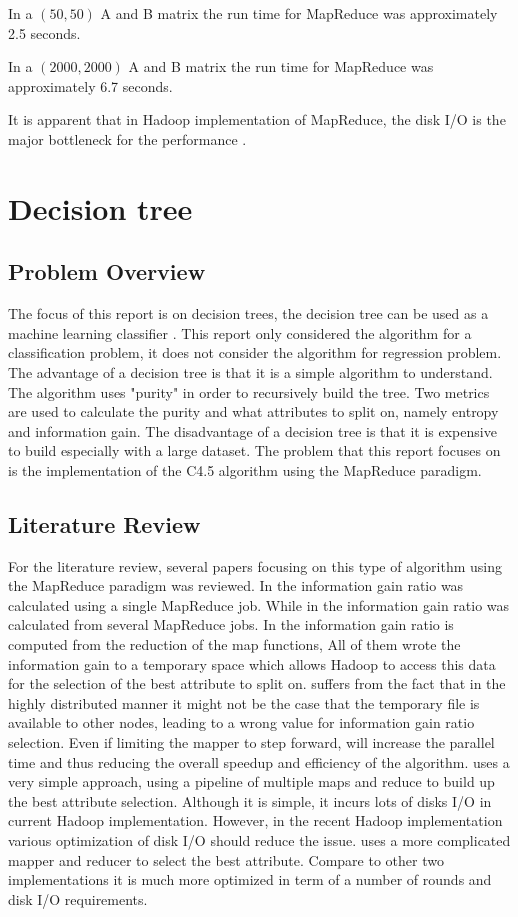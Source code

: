 \documentclass{article}
\begin{document}
In a $(50,50)$ A and B matrix the run time for MapReduce was approximately 2.5 seconds.

In a $(2000,2000)$ A and B matrix the run time for MapReduce was approximately 6.7 seconds.

It is apparent that in Hadoop implementation of MapReduce, the disk I/O is the major bottleneck for the performance \cite{c452017}.

\section{Decision tree}

\subsection{Problem Overview}
The focus of this report is on decision trees, the decision tree can be used as a machine learning classifier \cite{quin1}. This report only considered the algorithm for a classification problem, it does not consider the algorithm for regression problem.
The advantage of a decision tree is that it is a simple algorithm to understand. The algorithm uses "purity" in order to recursively build the tree.
Two metrics are used to calculate the purity and what attributes to split on, namely entropy and information gain.
The disadvantage of a decision tree is that it is expensive to build especially with a large dataset.
The problem that this report focuses on is the implementation of the C4.5 algorithm using the MapReduce paradigm.

\subsection{Literature Review}
For the literature review, several papers focusing on this type of algorithm using the MapReduce paradigm was reviewed.
In \cite{c452017} the information gain ratio was calculated using a single MapReduce job.
While in \cite{c45cn} the information gain ratio was calculated from several MapReduce jobs.
In \cite{c45in} the information gain ratio is computed from the reduction of the map functions,
All of them wrote the information gain to a temporary space which allows Hadoop to access this data for the selection of the best attribute to split on.
\cite{c45in} suffers from the fact that in the highly distributed manner it might not be the case that the temporary file is available to other nodes,
leading to a wrong value for information gain ratio selection.
Even if limiting the mapper to step forward, will increase the parallel time and thus reducing the overall speedup and efficiency of the algorithm.
\cite{c45cn} uses a very simple approach, using a pipeline of multiple maps and reduce to build up the best attribute selection.
Although it is simple, it incurs lots of disks I/O in current Hadoop implementation.
However, in the recent Hadoop implementation various optimization of disk I/O should reduce the issue.
\cite{c452017} uses a more complicated mapper and reducer to select the best attribute.
Compare to other two implementations it is much more optimized in term of a number of rounds and disk I/O requirements.
\end{document}
